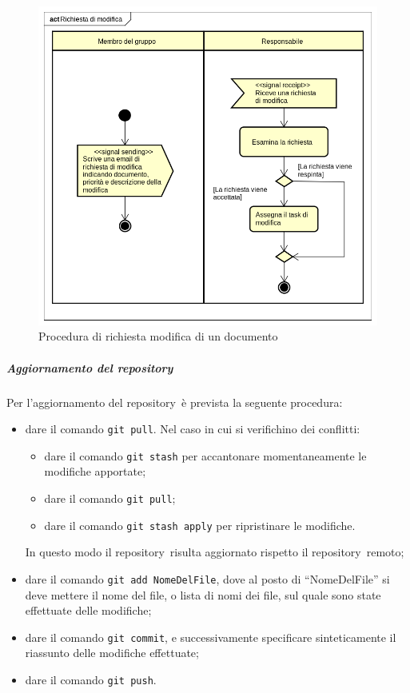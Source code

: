 \documentclass[../NormeProgetto.text]{subfiles}
\begin{document}
				\newpage
				\begin{figure}[H]
					\centering
					\includegraphics[scale=0.5, width=\textwidth]{sections/img/proceduraRichiestaModifica.png}
					\caption{Procedura di richiesta modifica di un documento}\label{fig:Procedura di richiesta modifica di un documento} 
				\end{figure}
			\subparagraph{Aggiornamento del repository}
				Per l'aggiornamento del repository\g\ è prevista la seguente procedura:
				\begin{itemize}
					\item dare il comando \texttt{git pull}. Nel caso in cui si verifichino dei conflitti:
						\begin{itemize}
							\item dare il comando \texttt{git stash} per accantonare momentaneamente le modifiche apportate;
							\item dare il comando \texttt{git pull};
							\item dare il comando \texttt{git stash apply} per ripristinare le modifiche.
						\end{itemize}
					In questo modo il repository\g\ risulta aggiornato rispetto il repository\g\ remoto;
					\item dare il comando \texttt{git add NomeDelFile}, dove al posto di ``NomeDelFile'' si deve mettere il nome del file, o lista di nomi dei file, sul quale sono state effettuate delle modifiche;
					\item dare il comando \texttt{git commit}, e successivamente specificare sinteticamente il riassunto delle modifiche effettuate;
					\item dare il comando \texttt{git push}.
				\end{itemize}
\end{document}
